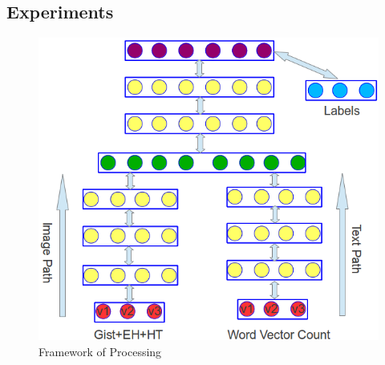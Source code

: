 \documentclass{beamer}
\begin{document}
\begin{CJK*}{UTF8}{gbsn}
\section{Experiments}
\begin{frame}
\begin{figure}
\includegraphics[scale=0.3]{images/pic5}
\caption{Framework of Processing}
\end{figure}
\end{frame}
\end{CJK*}
\end{document}
